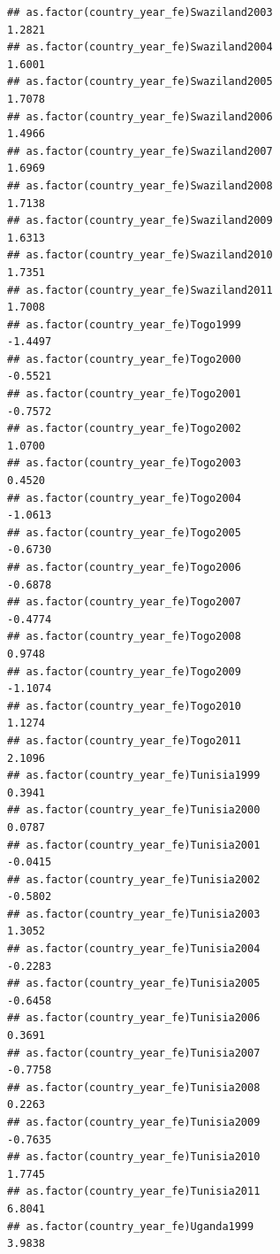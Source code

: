 \documentclass[
  a4paper,
]{article}
\begin{document}
\begin{verbatim}
## as.factor(country_year_fe)Swaziland2003                         1.2821
## as.factor(country_year_fe)Swaziland2004                         1.6001
## as.factor(country_year_fe)Swaziland2005                         1.7078
## as.factor(country_year_fe)Swaziland2006                         1.4966
## as.factor(country_year_fe)Swaziland2007                         1.6969
## as.factor(country_year_fe)Swaziland2008                         1.7138
## as.factor(country_year_fe)Swaziland2009                         1.6313
## as.factor(country_year_fe)Swaziland2010                         1.7351
## as.factor(country_year_fe)Swaziland2011                         1.7008
## as.factor(country_year_fe)Togo1999                             -1.4497
## as.factor(country_year_fe)Togo2000                             -0.5521
## as.factor(country_year_fe)Togo2001                             -0.7572
## as.factor(country_year_fe)Togo2002                              1.0700
## as.factor(country_year_fe)Togo2003                              0.4520
## as.factor(country_year_fe)Togo2004                             -1.0613
## as.factor(country_year_fe)Togo2005                             -0.6730
## as.factor(country_year_fe)Togo2006                             -0.6878
## as.factor(country_year_fe)Togo2007                             -0.4774
## as.factor(country_year_fe)Togo2008                              0.9748
## as.factor(country_year_fe)Togo2009                             -1.1074
## as.factor(country_year_fe)Togo2010                              1.1274
## as.factor(country_year_fe)Togo2011                              2.1096
## as.factor(country_year_fe)Tunisia1999                           0.3941
## as.factor(country_year_fe)Tunisia2000                           0.0787
## as.factor(country_year_fe)Tunisia2001                          -0.0415
## as.factor(country_year_fe)Tunisia2002                          -0.5802
## as.factor(country_year_fe)Tunisia2003                           1.3052
## as.factor(country_year_fe)Tunisia2004                          -0.2283
## as.factor(country_year_fe)Tunisia2005                          -0.6458
## as.factor(country_year_fe)Tunisia2006                           0.3691
## as.factor(country_year_fe)Tunisia2007                          -0.7758
## as.factor(country_year_fe)Tunisia2008                           0.2263
## as.factor(country_year_fe)Tunisia2009                          -0.7635
## as.factor(country_year_fe)Tunisia2010                           1.7745
## as.factor(country_year_fe)Tunisia2011                           6.8041
## as.factor(country_year_fe)Uganda1999                            3.9838

\end{verbatim}
\end{document}
